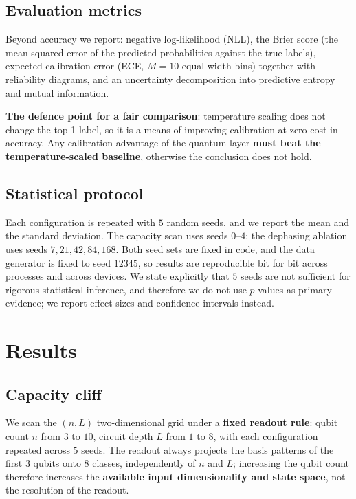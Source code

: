 \documentclass{article}
\begin{document}
\subsection{Evaluation metrics}

Beyond accuracy we report: negative log-likelihood (NLL), the Brier
score (the mean squared error of the predicted probabilities against the
true labels), expected calibration error (ECE, \(M = 10\) equal-width
bins) together with reliability diagrams, and an uncertainty
decomposition into predictive entropy and mutual information.

\textbf{The defence point for a fair comparison}: temperature scaling
does not change the top-1 label, so it is a means of improving
calibration at zero cost in accuracy. Any calibration advantage of the
quantum layer \textbf{must beat the temperature-scaled baseline},
otherwise the conclusion does not hold.

\subsection{Statistical protocol}

Each configuration is repeated with \(5\) random seeds, and we report
the mean and the standard deviation. The capacity scan uses seeds
\(0\)--\(4\); the dephasing ablation uses seeds \(7,21,42,84,168\). Both
seed sets are fixed in code, and the data generator is fixed to seed
\(12345\), so results are reproducible bit for bit across processes and
across devices. We state explicitly that \(5\) seeds are not sufficient
for rigorous statistical inference, and therefore we do not use \(p\)
values as primary evidence; we report effect sizes and confidence
intervals instead.

\section{Results}

\subsection{Capacity cliff}

We scan the \((n,L)\) two-dimensional grid under a \textbf{fixed readout
rule}: qubit count \(n\) from \(3\) to \(10\), circuit depth \(L\) from
\(1\) to \(8\), with each configuration repeated across \(5\) seeds. The
readout always projects the basis patterns of the first \(3\) qubits
onto \(8\) classes, independently of \(n\) and \(L\); increasing the
qubit count therefore increases the \textbf{available input
dimensionality and state space}, not the resolution of the readout.
\end{document}

